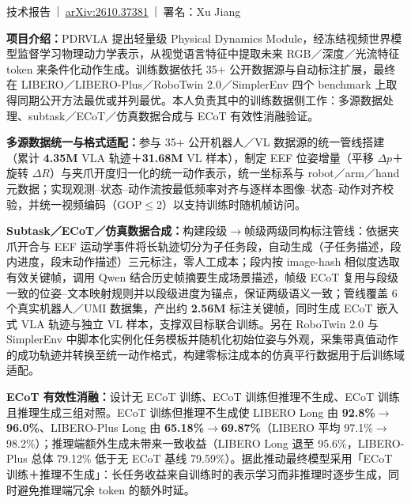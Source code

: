 {\color{SecondaryText}技术报告\,｜\,\href{https://arxiv.org/abs/2610.37381}{\textcolor{SecondaryText}{arXiv:2610.37381}}\,｜\,署名：Xu Jiang}\par
\textbf{项目介绍：}PDRVLA 提出轻量级 Physical Dynamics Module，经冻结视频世界模型监督学习物理动力学表示，从视觉语言特征中提取未来 RGB／深度／光流特征 token 来条件化动作生成。训练数据依托 35+ 公开数据源与自动标注扩展，最终在 LIBERO／LIBERO-Plus／RoboTwin 2.0／SimplerEnv 四个 benchmark 上取得同期公开方法最优或并列最优。本人负责其中的训练数据侧工作：多源数据处理、subtask／ECoT／仿真数据合成与 ECoT 有效性消融验证。\par
\begin{experienceitems}
  \item \textbf{多源数据统一与格式适配：}参与 35+ 公开机器人／VL 数据源的统一管线搭建（累计 \textbf{4.35M} VLA 轨迹＋\textbf{31.68M} VL 样本），制定 EEF 位姿增量（平移 $\Delta p$＋旋转 $\Delta R$）与夹爪开度归一化的统一动作表示，统一坐标系与 robot／arm／hand 元数据；实现观测--状态--动作流按最低频率对齐与逐样本图像--状态--动作对齐校验，并统一视频编码（GOP$\leq$2）以支持训练时随机帧访问。
  \item \textbf{Subtask／ECoT／仿真数据合成：}构建段级$\to$帧级两级同构标注管线：依据夹爪开合与 EEF 运动学事件将长轨迹切分为子任务段，自动生成（子任务描述，段内进度，段末动作描述）三元标注，零人工成本；段内按 image-hash 相似度选取有效关键帧，调用 Qwen 结合历史帧摘要生成场景描述，帧级 ECoT 复用与段级一致的位姿--文本映射规则并以段级进度为锚点，保证两级语义一致；管线覆盖 6 个真实机器人／UMI 数据集，产出约 \textbf{2.56M} 标注关键帧，同时生成 ECoT 嵌入式 VLA 轨迹与独立 VL 样本，支撑双目标联合训练。另在 RoboTwin 2.0 与 SimplerEnv 中脚本化实例化任务模板并随机化初始位姿与外观，采集带真值动作的成功轨迹并转换至统一动作格式，构建零标注成本的仿真平行数据用于后训练域适配。
  \item \textbf{ECoT 有效性消融：}设计无 ECoT 训练、ECoT 训练但推理不生成、ECoT 训练且推理生成三组对照。ECoT 训练但推理不生成使 LIBERO Long 由 \textbf{92.8\%$\to$96.0\%}、LIBERO-Plus Long 由 \textbf{65.18\%$\to$69.87\%}（LIBERO 平均 97.1\%$\to$98.2\%）；推理端额外生成未带来一致收益（LIBERO Long 退至 95.6\%，LIBERO-Plus 总体 79.12\% 低于无 ECoT 基线 79.59\%）。据此推动最终模型采用「ECoT 训练＋推理不生成」：长任务收益来自训练时的表示学习而非推理时逐步生成，同时避免推理端冗余 token 的额外时延。
\end{experienceitems}
